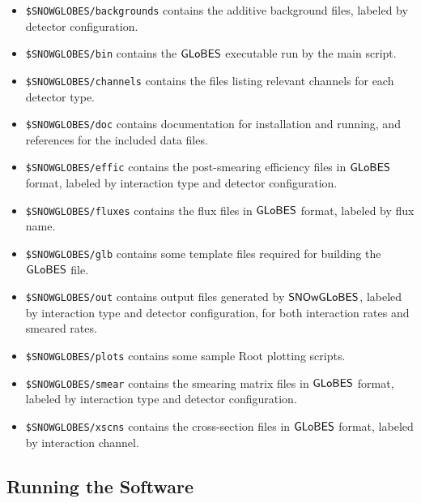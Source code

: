 \documentclass[12pt]{article}
\newcommand{\globes}{\sf{GLoBES}}
\newcommand{\snowglobes}{\sf{SNOwGLoBES}}
\begin{document}
\begin{itemize}

\item \texttt{\$SNOWGLOBES/backgrounds}  contains the additive background files, labeled by detector configuration. 


\item \texttt{\$SNOWGLOBES/bin}  contains the $\globes$ executable run by the main script.

\item \texttt{\$SNOWGLOBES/channels}  contains the
files listing relevant channels for each detector type.

\item \texttt{\$SNOWGLOBES/doc}  contains documentation for installation and running, and references for the included data files.


\item \texttt{\$SNOWGLOBES/effic}  contains the
 post-smearing efficiency files in $\globes$ format, labeled by interaction type and detector configuration.

\item \texttt{\$SNOWGLOBES/fluxes}  contains the flux files in $\globes$ format, labeled by flux name.

\item \texttt{\$SNOWGLOBES/glb}  contains some template files required for building the $\globes$ file.

\item \texttt{\$SNOWGLOBES/out} contains output files generated by
  $\snowglobes$, labeled by interaction type and detector configuration,
  for both interaction rates and smeared rates.   

\item \texttt{\$SNOWGLOBES/plots} contains some sample Root plotting scripts.

\item \texttt{\$SNOWGLOBES/smear}  contains the smearing matrix files in $\globes$ format, labeled by interaction type and detector configuration.

\item \texttt{\$SNOWGLOBES/xscns}  contains the cross-section files in $\globes$ format, labeled by interaction channel.



\end{itemize}


\subsection{Running the Software}
\end{document}
